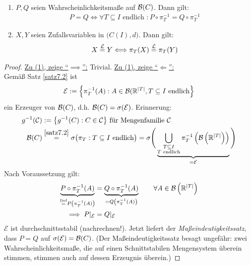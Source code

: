 \begin{satz}\label{satz7.5}\
\begin{enumerate}[label=(\arabic*)]
\item $P,Q$ seien Wahrscheinlichkeitsmaße auf $\mathcal{B}(C)$. Dann gilt:
\begin{align*}
P=Q\Longleftrightarrow\forall T\subseteq I\text{ endlich }: P\circ\pi_T^{-1}=Q\circ\pi_T^{-1}
\end{align*}
\item $X,Y$ seien Zufallsvariablen in $\big(C(I),d\big)$. Dann gilt:
\begin{align*}
X\stackrel{\mathcal{L}}{=}Y\Longleftrightarrow \pi_T(X)\stackrel{\mathcal{L}}{=}\pi_T(Y)
\end{align*}
\end{enumerate}
\end{satz}
\begin{proof}
\underline{Zu (1), zeige ``$\implies$'':} Trivial.\nl
\underline{Zu (1), zeige ``$\Longleftarrow$'':}\\
Gemäß Satz \ref{satz7.2} ist
\begin{align*}
\mathcal{E}:=\left\lbrace\pi_T^{-1}(A):A\in\mathcal{B}(\mathbb{R}^{|T|},T\subseteq I\text{ endlich}\right\rbrace
\end{align*}
ein Erzeuger von $\mathcal{B}(C)$, d.h. $\mathcal{B}(C)=\sigma(\mathcal{E})$. Erinnerung:
\begin{align*}
g^{-1}(\mathcal{C})&:=\big\lbrace g^{-1}(C):C\in\mathcal{C}\big\rbrace\text{ für Mengenfamilie }\mathcal{C}\\
\mathcal{B}(C)&\stackrel{\ref{satz7.2}}{=}\sigma\big(\pi_T:T\subseteq I\text{ endlich}\big)
=\sigma\Bigg(\underbrace{\bigcup\limits_{\begin{subarray}{c}T\subseteq I\\T\text{ endlich}\end{subarray}}\pi_T^{-1}\left(\mathcal{B}\left(\mathbb{R}^{|T|}\right)\right)}_{=\mathcal{E}}\Bigg)
\end{align*}
Nach Voraussetzung gilt:
\begin{align*}
\underbrace{P\circ\pi_T^{-1}(A)}_{\stackrel{\text{Def}}{=}P\left(\pi_T^{-1}(A)\right)}&=\underbrace{Q\circ\pi_T^{-1}(A)}_{=Q\left(\pi_T^{-1}(A)\right)}\qquad\forall A\in\mathcal{B}\left(\mathbb{R}^{|T|}\right)\\
\implies
P|_\mathcal{E}&=Q|_\mathcal{E}
\end{align*}
$\mathcal{E}$ ist durchschnittsstabil (nachrechnen!). Jetzt liefert der \textit{Maßeindeutigkeitssatz}, dass $P=Q$ auf $\sigma(\mathcal{E})=\mathcal{B}(C)$.
(Der Maßeindeutigkeitssatz besagt ungefähr: zwei Wahrscheinlichkeitsmaße, die auf einen Schnittstabilen Mengensystem überein stimmen, stimmen auch auf dessen Erzeugnis überein.)
\end{proof}




